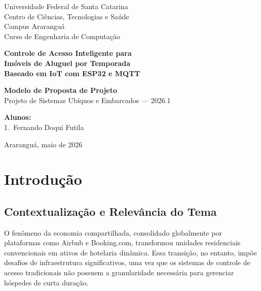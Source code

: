 \documentclass[12pt,a4paper]{article}
\begin{document}

\begin{titlepage}
  \centering
  {\large Universidade Federal de Santa Catarina\\
         Centro de Ciências, Tecnologias e Saúde\\
         Campus Araranguá\\[2mm]
         Curso de Engenharia de Computação}

  \vspace{3cm}

  {\LARGE\bfseries Controle de Acesso Inteligente para\\
  Imóveis de Aluguel por Temporada\\
  Baseado em IoT com ESP32 e MQTT}

  \vspace{1.5cm}

  {\large\textbf{Modelo de Proposta de Projeto}}\\[4mm]
  {\large Projeto de Sistemas Ubíquos e Embarcados — 2026.1}

  \vfill

  \begin{flushleft}
    \textbf{Alunos:}\\[2mm]
    1.\ Fernando Doqui Futila
  \end{flushleft}

  \vspace{2cm}
  {\large Araranguá, maio de 2026}
\end{titlepage}

\tableofcontents
\newpage

\section{Introdução}

\subsection{Contextualização e Relevância do Tema}

O fenômeno da economia compartilhada, consolidado globalmente por plataformas como
Airbnb e Booking.com, transformou unidades residenciais convencionais em ativos de
hotelaria dinâmica. Essa transição, no entanto, impõe desafios de infraestrutura
significativos, uma vez que os sistemas de controle de acesso tradicionais não possuem
a granularidade necessária para gerenciar hóspedes de curta duração.
\end{document}
